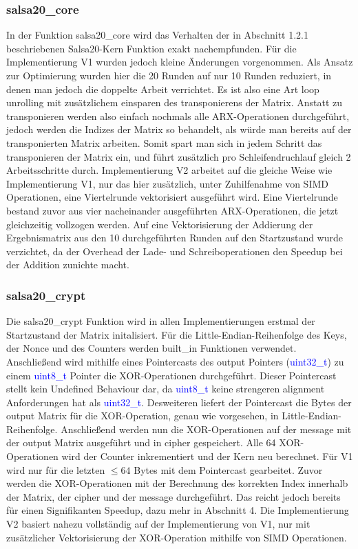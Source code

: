 \documentclass[course=erap]{aspdoc}
\begin{document}
\subsubsection{salsa20\_core}
In der Funktion salsa20\_core wird das Verhalten der in Abschnitt 1.2.1 beschriebenen Salsa20-Kern Funktion exakt nachempfunden. Für die Implementierung V1 wurden jedoch kleine Änderungen vorgenommen.
Als Ansatz zur Optimierung wurden hier die 20 Runden auf nur 10 Runden reduziert, in denen man jedoch die doppelte Arbeit verrichtet. Es ist also eine Art loop unrolling mit zusätzlichem einsparen des 
transponierens der Matrix. Anstatt zu transponieren werden also einfach nochmals alle ARX-Operationen durchgeführt, jedoch werden die Indizes der Matrix so behandelt, als würde man bereits auf
der transponierten Matrix arbeiten. Somit spart man sich in jedem Schritt das transponieren der Matrix ein, und führt zusätzlich pro Schleifendruchlauf gleich 2 Arbeitsschritte durch. Implementierung V2
arbeitet auf die gleiche Weise wie Implementierung V1, nur das hier zusätzlich, unter Zuhilfenahme von SIMD Operationen, eine Viertelrunde vektorisiert ausgeführt wird. Eine Viertelrunde bestand zuvor 
aus vier nacheinander ausgeführten ARX-Operationen, die jetzt gleichzeitig vollzogen werden. Auf eine Vektorisierung der Addierung der Ergebnismatrix aus den 10 durchgeführten Runden auf den Startzustand wurde verzichtet,
da der Overhead der Lade- und Schreiboperationen den Speedup bei der Addition zunichte macht.

\subsubsection{salsa20\_crypt}
Die salsa20\_crypt Funktion wird in allen Implementierungen erstmal der Startzustand der Matrix initalisiert. Für die Little-Endian-Reihenfolge des Keys, der Nonce und des Counters werden built\_in Funktionen verwendet.
Anschließend wird mithilfe eines Pointercasts des output Pointers (\textcolor{blue}{uint32\_t}) zu einem \textcolor{blue}{uint8\_t} Pointer die XOR-Operationen durchgeführt. Dieser Pointercast stellt kein Undefined Behaviour dar, 
da \textcolor{blue}{uint8\_t} keine strengeren alignment Anforderungen hat als \textcolor{blue}{uint32\_t}. Desweiteren liefert der Pointercast die Bytes der output Matrix für die XOR-Operation, genau wie vorgesehen, in Little-Endian-Reihenfolge.
Anschließend werden nun die XOR-Operationen auf der message mit der output Matrix ausgeführt und in cipher gespeichert. Alle 64 XOR-Operationen wird der Counter inkrementiert und der Kern neu berechnet. Für V1 wird nur für die letzten $\leq 64$ Bytes mit dem Pointercast gearbeitet.
Zuvor werden die XOR-Operationen mit der Berechnung des korrekten Index innerhalb der Matrix, der cipher und der message durchgeführt. Das reicht jedoch bereits für einen Signifikanten Speedup, dazu mehr in Abschnitt 4.
Die Implementierung V2 basiert nahezu vollständig auf der Implementierung von V1, nur mit zusätzlicher Vektorisierung der XOR-Operation mithilfe von SIMD Operationen.
\end{document}
